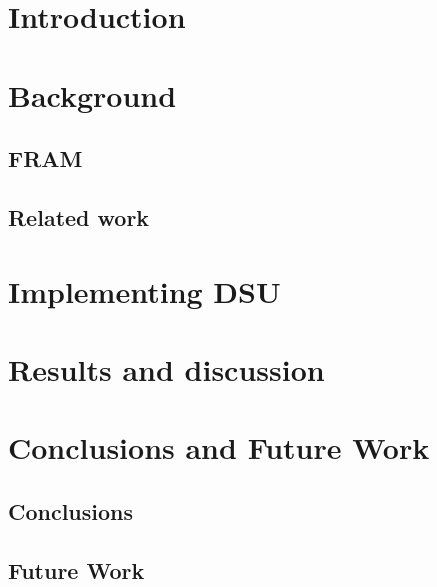 \documentclass[a4paper, 11pt]{report}
\begin{document}


\setcounter{page}{2}
\tableofcontents
\newpage

\listoftodos
\begin{abstract}

\end{abstract}

\chapter{Introduction}



\chapter{Background}

\section{FRAM}\label{sec:fram}

\section{Related work}\label{sec:rel_work}



\chapter{Implementing DSU}


\chapter{Results and discussion}


\chapter{Conclusions and Future Work}
\section{Conclusions}\label{sec:conclusions}


\section{Future Work}\label{sec:future_work}


\printbibliography
\end{document}

